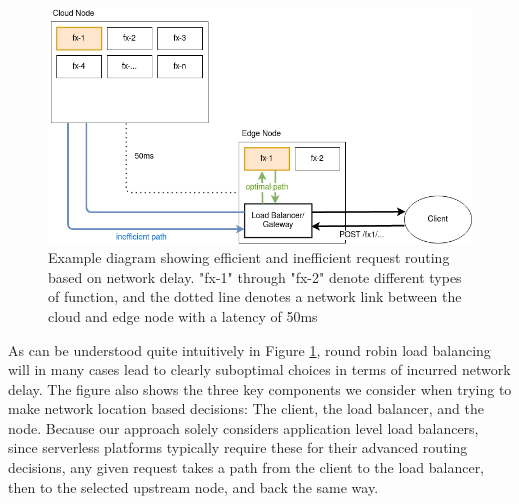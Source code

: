 \begin{figure}
    \centering
    \includegraphics[width=12cm]{graphics/diagrams/efficient_path_example.png}
    \caption{Example diagram showing efficient and inefficient request routing based on network delay. "fx-1" through "fx-2" denote different types of function, and the dotted line denotes a network link between the cloud and edge node with a latency of 50ms}
    \label{fig:efficient_path}
\end{figure}

As can be understood quite intuitively in Figure \ref{fig:efficient_path}, round robin load balancing will in many cases lead to clearly suboptimal choices in terms of incurred network delay. The figure also shows the three key components we consider when trying to make network location based decisions: The client, the load balancer, and the node. Because our approach solely considers application level load balancers, since serverless platforms typically require these for their advanced routing decisions, any given request takes a path from the client to the load balancer, then to the selected upstream node, and back the same way.

